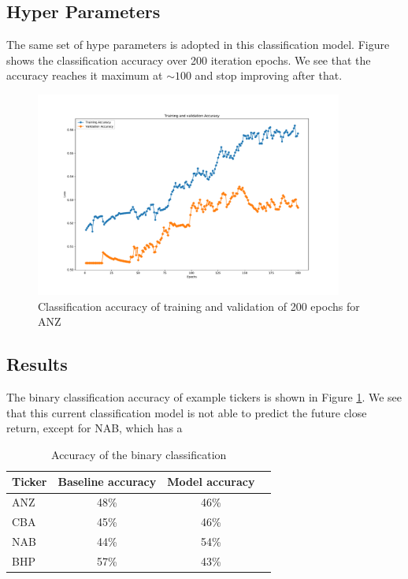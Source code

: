 \documentclass[a4paper, 11pt, usenatbib]{article}
\begin{document}
\subsection{Hyper Parameters}
The same set of hype parameters is adopted in this classification model. Figure	\label{fig:classification_epochs} shows the classification accuracy over 200 iteration epochs. We see that the accuracy reaches it maximum at $\sim 100$ and stop improving after that.
\begin{figure}
	\centering
	\includegraphics[width=0.9\textwidth]{./figures/classification_epochs.pdf}
	\caption[]
	{Classification accuracy of training and validation of 200 epochs for ANZ}
		\label{fig:classification_epochs}
\end{figure}

\subsection{Results}
The binary classification accuracy of example tickers is shown in Figure \ref{tab:classification_accuracy}. We see that this current classification model is not able to predict the future close return, except for NAB, which has a 
\begin{table}
 \caption{Accuracy of the binary classification}
 \label{tab:classification_accuracy}
 \centering
 \begin{tabular}
 { l  c  c  l }
  \hline
 Ticker & Baseline accuracy & Model accuracy\\
 \hline
 ANZ & 48\% & 46\% \\
 CBA & 45\% & 46\% \\
 NAB & 44\% & 54\%\\
 BHP & 57\% & 43\% &\\

  \hline
 \end{tabular}
\end{table}  
\end{document}
